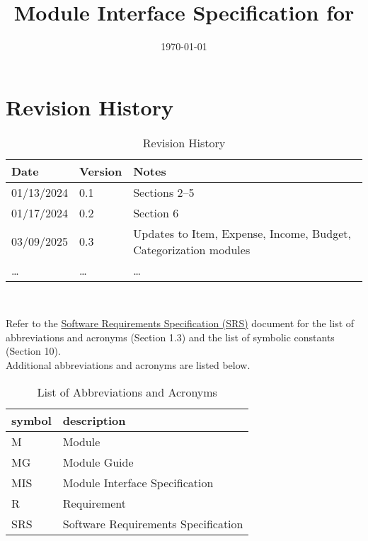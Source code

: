 \documentclass[12pt, titlepage]{article}
\begin{document}
\title{Module Interface Specification for \progname{}}

\author{\authname}

\date{\today}

\maketitle


\section{Revision History}

\begin{table}[H]
\caption{Revision History}
\begin{tabularx}{\textwidth}{p{3cm}p{2cm}X}
\toprule {\bf Date} & {\bf Version} & {\bf Notes}\\
\midrule
01/13/2024 & 0.1 & Sections 2--5 \\
01/17/2024 & 0.2 & Section 6\\
03/09/2025 & 0.3 & Updates to Item, Expense, Income, Budget, Categorization modules\\
\ldots & \ldots & \ldots \\
\bottomrule
\end{tabularx}
\end{table}

~\newpage

Refer to the
\href{https://github.com/PlutosCapstone/Plutos/blob/main/docs/SRS/SRS.pdf}{Software
Requirements Specification (SRS)} document for the list of abbreviations and
acronyms (Section 1.3) and the list of symbolic constants (Section 10).\\

Additional abbreviations and acronyms are listed below.


\renewcommand{\arraystretch}{1.2}
\begin{table}[H]
\caption{List of Abbreviations and Acronyms}
\centering
\begin{tabularx}{\textwidth}{l X} 
	\toprule		
	\textbf{symbol} & \textbf{description}\\
	\midrule 
	M & Module \\
	MG & Module Guide \\
  MIS & Module Interface Specification\\
	R & Requirement\\
	SRS & Software Requirements Specification\\
	\bottomrule
\end{tabularx}
\end{table}
\end{document}
